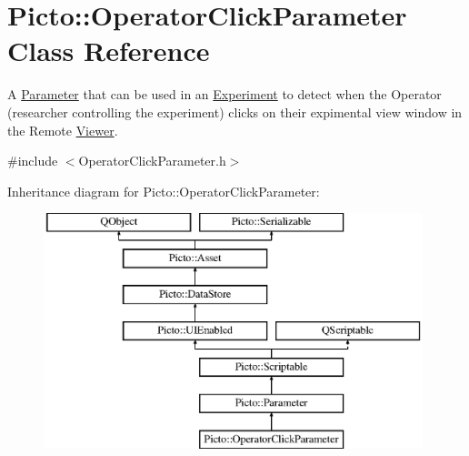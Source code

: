 \hypertarget{class_picto_1_1_operator_click_parameter}{\section{Picto\-:\-:Operator\-Click\-Parameter Class Reference}
\label{class_picto_1_1_operator_click_parameter}
}


A \hyperlink{class_picto_1_1_parameter}{Parameter} that can be used in an \hyperlink{class_picto_1_1_experiment}{Experiment} to detect when the Operator (researcher controlling the experiment) clicks on their expimental view window in the Remote \hyperlink{class_viewer}{Viewer}.  




{\ttfamily \#include $<$Operator\-Click\-Parameter.\-h$>$}

Inheritance diagram for Picto\-:\-:Operator\-Click\-Parameter\-:\begin{figure}[H]
\begin{center}
\leavevmode
\includegraphics[height=6.841187cm]{class_picto_1_1_operator_click_parameter}
\end{center}
\end{figure}
